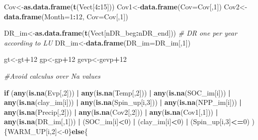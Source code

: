 \documentclass[
  10pt,
  b5paper,
]{book}
\newenvironment{Shaded}{\begin{snugshade}}{\end{snugshade}}
\newcommand{\CommentTok}[1]{\textcolor[rgb]{0.56,0.35,0.01}{\textit{#1}}}
\newcommand{\ControlFlowTok}[1]{\textcolor[rgb]{0.13,0.29,0.53}{\textbf{#1}}}
\newcommand{\DataTypeTok}[1]{\textcolor[rgb]{0.13,0.29,0.53}{#1}}
\newcommand{\DecValTok}[1]{\textcolor[rgb]{0.00,0.00,0.81}{#1}}
\newcommand{\KeywordTok}[1]{\textcolor[rgb]{0.13,0.29,0.53}{\textbf{#1}}}
\newcommand{\NormalTok}[1]{#1}
\newcommand{\OperatorTok}[1]{\textcolor[rgb]{0.81,0.36,0.00}{\textbf{#1}}}
\newcommand{\StringTok}[1]{\textcolor[rgb]{0.31,0.60,0.02}{#1}}
\begin{document}
\begin{Shaded}
\begin{Highlighting}[]
\NormalTok{Cov<-}\KeywordTok{as.data.frame}\NormalTok{(}\KeywordTok{t}\NormalTok{(Vect[}\DecValTok{4}\OperatorTok{:}\DecValTok{15}\NormalTok{]))}
\NormalTok{Cov1<-}\KeywordTok{data.frame}\NormalTok{(}\DataTypeTok{Cov=}\NormalTok{Cov[,}\DecValTok{1}\NormalTok{])}
\NormalTok{Cov2<-}\KeywordTok{data.frame}\NormalTok{(}\DataTypeTok{Month=}\DecValTok{1}\OperatorTok{:}\DecValTok{12}\NormalTok{, }\DataTypeTok{Cov=}\NormalTok{Cov[,}\DecValTok{1}\NormalTok{])}

\NormalTok{DR_im<-}\KeywordTok{as.data.frame}\NormalTok{(}\KeywordTok{t}\NormalTok{(Vect[nDR_beg}\OperatorTok{:}\NormalTok{nDR_end])) }\CommentTok{# DR one per year according to LU}
\NormalTok{DR_im<-}\KeywordTok{data.frame}\NormalTok{(}\DataTypeTok{DR_im=}\NormalTok{DR_im[,}\DecValTok{1}\NormalTok{])}

\NormalTok{gt<-gt}\OperatorTok{+}\DecValTok{12}
\NormalTok{gp<-gp}\OperatorTok{+}\DecValTok{12}
\NormalTok{gevp<-gevp}\OperatorTok{+}\DecValTok{12}

\CommentTok{#Avoid calculus over Na values }

\ControlFlowTok{if}\NormalTok{ (}\KeywordTok{any}\NormalTok{(}\KeywordTok{is.na}\NormalTok{(Evp[,}\DecValTok{2}\NormalTok{])) }\OperatorTok{|}\StringTok{ }\KeywordTok{any}\NormalTok{(}\KeywordTok{is.na}\NormalTok{(Temp[,}\DecValTok{2}\NormalTok{])) }\OperatorTok{|}\StringTok{ }\KeywordTok{any}\NormalTok{(}\KeywordTok{is.na}\NormalTok{(SOC_im[i])) }\OperatorTok{|}\StringTok{ }\KeywordTok{any}\NormalTok{(}\KeywordTok{is.na}\NormalTok{(clay_im[i])) }\OperatorTok{|}\StringTok{ }\KeywordTok{any}\NormalTok{(}\KeywordTok{is.na}\NormalTok{(Spin_up[i,}\DecValTok{3}\NormalTok{]))  }\OperatorTok{|}\StringTok{ }\KeywordTok{any}\NormalTok{(}\KeywordTok{is.na}\NormalTok{(NPP_im[i])) }\OperatorTok{|}\StringTok{ }\KeywordTok{any}\NormalTok{(}\KeywordTok{is.na}\NormalTok{(Precip[,}\DecValTok{2}\NormalTok{]))  }\OperatorTok{|}\StringTok{  }\KeywordTok{any}\NormalTok{(}\KeywordTok{is.na}\NormalTok{(Cov2[,}\DecValTok{2}\NormalTok{]))  }\OperatorTok{|}\StringTok{  }\KeywordTok{any}\NormalTok{(}\KeywordTok{is.na}\NormalTok{(Cov1[,}\DecValTok{1}\NormalTok{]))  }\OperatorTok{|}\StringTok{ }\KeywordTok{any}\NormalTok{(}\KeywordTok{is.na}\NormalTok{(DR_im[,}\DecValTok{1}\NormalTok{]))    }\OperatorTok{|}\StringTok{  }\NormalTok{(SOC_im[i]}\OperatorTok{<}\DecValTok{0}\NormalTok{) }\OperatorTok{|}\StringTok{ }\NormalTok{(clay_im[i]}\OperatorTok{<}\DecValTok{0}\NormalTok{) }\OperatorTok{|}\StringTok{ }\NormalTok{(Spin_up[i,}\DecValTok{3}\NormalTok{]}\OperatorTok{<=}\DecValTok{0}\NormalTok{) ) \{WARM_UP[i,}\DecValTok{2}\NormalTok{]<-}\DecValTok{0}\NormalTok{\}}\ControlFlowTok{else}\NormalTok{\{}


\end{Highlighting}
\end{Shaded}
\end{document}
